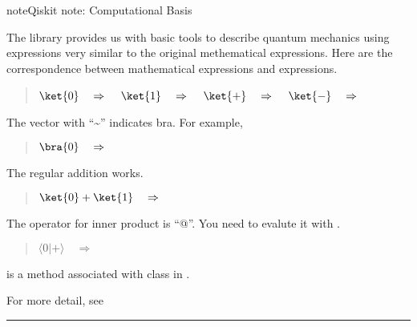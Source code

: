 \documentclass[letterpaper,10pt,english]{jupyterBook}
\begin{document}
\begin{sphinxadmonition}{note}{Qiskit note: Computational Basis}

\sphinxAtStartPar
The  library provides us with basic tools to describe quantum mechanics using expressions very similar to the original methematical expressions.  Here are the correspondence between mathematical expressions and  expressions.
\begin{quote}

\sphinxAtStartPar
\(\ket{0} \quad \Rightarrow \quad\) \(\ket{1} \quad \Rightarrow \quad\) \(\ket{+} \quad \Rightarrow \quad\) \(\ket{-} \quad \Rightarrow \quad\) 
\end{quote}

\sphinxAtStartPar
The vector with “\textasciitilde{}” indicates bra.  For example,
\begin{quote}

\sphinxAtStartPar
\(\bra{0} \quad  \Rightarrow \quad\) 
\end{quote}

\sphinxAtStartPar
The regular addition works.
\begin{quote}

\sphinxAtStartPar
\(\ket{0} + \ket{1} \quad \Rightarrow \quad\)  
\end{quote}

\sphinxAtStartPar
The operator for inner product is “@”. You need to evalute it with .
\begin{quote}

\sphinxAtStartPar
\(\langle 0 | + \rangle \quad \Rightarrow \quad\)  
\end{quote}

\sphinxAtStartPar
{} is a method associated with  class in .

\sphinxAtStartPar
For more detail, see 
\end{sphinxadmonition}


\bigskip\hrule\bigskip
\end{document}
